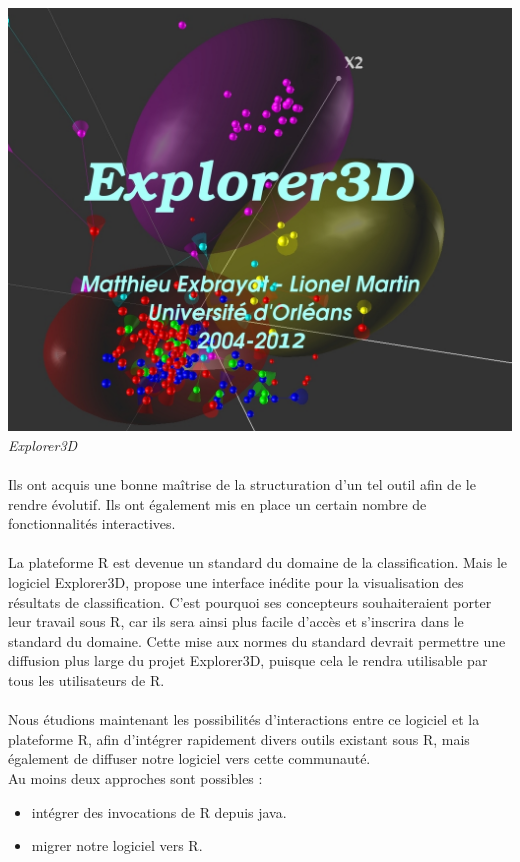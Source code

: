 \begin{center}
\includegraphics[scale=0.3]{explorer3d.jpg}\\
\textit{Explorer3D}
\end{center}

\paragraph{}
Ils ont acquis une bonne maîtrise de la structuration d'un tel outil afin de le rendre évolutif. Ils ont également mis en place un certain nombre de fonctionnalités interactives.
\newpage

\paragraph{} La plateforme R est devenue un standard du domaine de la classification. Mais le logiciel Explorer3D, propose une interface inédite pour la visualisation des résultats de classification. C'est pourquoi ses concepteurs souhaiteraient porter leur travail sous R, car ils sera ainsi plus facile d'accès et s'inscrira dans le standard du domaine. Cette mise aux normes du standard devrait permettre une diffusion plus large du projet Explorer3D, puisque cela le rendra utilisable par tous les utilisateurs de R.

\paragraph{}
Nous étudions maintenant les possibilités d'interactions entre ce logiciel et la plateforme R, afin d'intégrer rapidement divers outils existant sous R, mais également de diffuser notre logiciel vers cette communauté.\\
Au moins deux approches sont possibles :
\begin{itemize}
\item intégrer des invocations de R depuis java.
\item migrer notre logiciel vers R.
\end{itemize}


